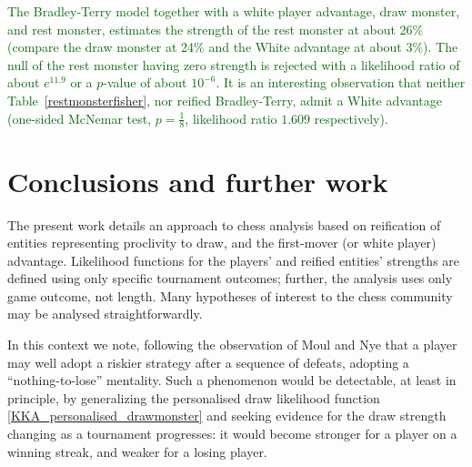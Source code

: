 \documentclass[review]{elsarticle}
\begin{document}
\begin{table}
\textcolor{DarkGreen}{
  \caption{Results for the 25 won games (out of 49 played) in
    Cura\c{c}ao 1962 between rested and unrested
    players \label{restmonsterfisher}} \centering {}
  }
\end{table}

\textcolor{DarkGreen}{The Bradley-Terry model together with a white
  player advantage, draw monster, and rest monster, estimates the
  strength of the rest monster at about 26\% (compare the draw monster
  at 24\% and the White advantage at about 3\%).  The null of the rest
  monster having zero strength is rejected with a likelihood ratio of
  about $e^{11.9}$ or a $p$-value of about $10^{-6}$.  It is an
  interesting observation that neither Table~\ref{restmonsterfisher},
  nor reified Bradley-Terry, admit a White advantage (one-sided
  McNemar test, $p=\frac{1}{8}$, likelihood ratio $1.609$
  respectively).  }

\section{Conclusions and further work}

The present work details an approach to chess analysis based on
reification of entities representing proclivity to draw, and the
first-mover (or white player) advantage.  Likelihood functions for the
players' and reified entities' strengths are defined using only
specific tournament outcomes; further, the analysis uses only game
outcome, not length.  Many hypotheses of interest to the chess
community may be analysed straightforwardly.

In this context we note, following the observation of Moul and Nye
that a player may well adopt a riskier strategy after a sequence of
defeats, adopting a ``nothing-to-lose'' mentality.  Such a phenomenon
would be detectable, at least in principle, by generalizing the
personalised draw likelihood function
\ref{KKA_personalised_drawmonster} and seeking evidence for the draw
strength changing as a tournament progresses: it would become stronger
for a player on a winning streak, and weaker for a losing player.
\end{document}
